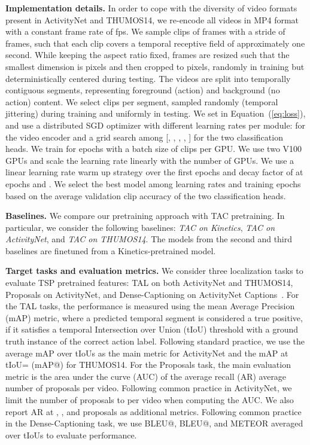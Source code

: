\documentclass[10pt,twocolumn,letterpaper]{article}
\begin{document}
\vspace{3pt}\noindent\textbf{Implementation details.}
In order to cope with the diversity of video formats present in ActivityNet and THUMOS14, we re-encode all videos in MP4 format with a constant frame rate of  fps. We sample clips of  frames with a stride of  frames, such that each clip covers a temporal receptive field of approximately one second. While keeping the aspect ratio fixed, frames are resized such that the smallest dimension is  pixels and then cropped to  pixels, randomly in training but deterministically centered during testing.
The videos are split into temporally contiguous segments, representing foreground (action) and background (no action) content. We select  clips per segment, sampled randomly (temporal jittering) during training and uniformly in testing.
We set  in Equation~(\ref{eq:loss}), and use a distributed SGD optimizer with different learning rates per module:  for the video encoder and a grid search among [, , , , ] for the two classification heads. We train for  epochs with a batch size of  clips per GPU. We use two V100 GPUs and scale the learning rate linearly with the number of GPUs. We use a linear learning rate warm up strategy over the first  epochs and decay factor of  at epochs  and . We select the best model among learning rates and training epochs based on the average validation clip accuracy of the two classification heads.

\vspace{3pt}\noindent\textbf{Baselines.}
We compare our pretraining approach with TAC pretraining. In particular, we consider the following baselines: \textit{TAC on Kinetics}, \textit{TAC on ActivityNet}, and \textit{TAC on THUMOS14}. The models from the second and third baselines are finetuned from a Kinetics-pretrained model.


\vspace{3pt}\noindent\textbf{Target tasks and evaluation metrics.}
We consider three localization tasks to evaluate TSP pretrained features: TAL on both ActivityNet and THUMOS14, Proposals on ActivityNet, and Dense-Captioning on ActivityNet Captions~\cite{activitynet_captions_dataset}. 
For the TAL tasks, the performance is measured using the mean Average Precision (mAP) metric, where a predicted temporal segment is considered a true positive, if it satisfies a temporal Intersection over Union (tIoU) threshold with a ground truth instance of the correct action label. Following standard practice, we use the average mAP over tIoUs  as the main metric for ActivityNet and the mAP at tIoU= (mAP@) for THUMOS14. 
For the Proposals task, the main evaluation metric is the area under the curve (AUC) of the average recall (AR) \vs average number of proposals per video. Following common practice in ActivityNet, we limit the number of proposals to  per video when computing the AUC. We also report AR at , , and  proposals as additional metrics.
Following common practice in the Dense-Captioning task, we use BLEU@, BLEU@, and METEOR averaged over tIoUs  to evaluate performance. 
\end{document}
